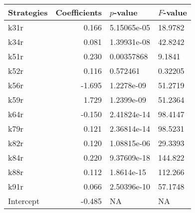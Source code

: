 \begin{tabular}{lrll}
\toprule
Strategies &  Coefficients &    $p$-value & $F$-value \\
\midrule
      k31r &         0.166 &  5.15065e-05 &   18.9782 \\
      k34r &         0.081 &  1.39931e-08 &   42.8242 \\
      k51r &         0.230 &   0.00357868 &    9.1841 \\
      k52r &         0.116 &     0.572461 &   0.32205 \\
      k56r &        -1.695 &   1.2278e-09 &   51.2719 \\
      k59r &         1.729 &   1.2399e-09 &   51.2364 \\
      k64r &        -0.150 &  2.41824e-14 &   98.4147 \\
      k79r &         0.121 &  2.36814e-14 &   98.5231 \\
      k82r &         0.120 &  1.08815e-06 &   29.3393 \\
      k84r &         0.220 &  9.37609e-18 &   144.822 \\
      k88r &         0.112 &   1.8614e-15 &   112.266 \\
      k91r &         0.066 &  2.50396e-10 &   57.1748 \\
 Intercept &        -0.485 &           NA &        NA \\
\bottomrule
\end{tabular}
